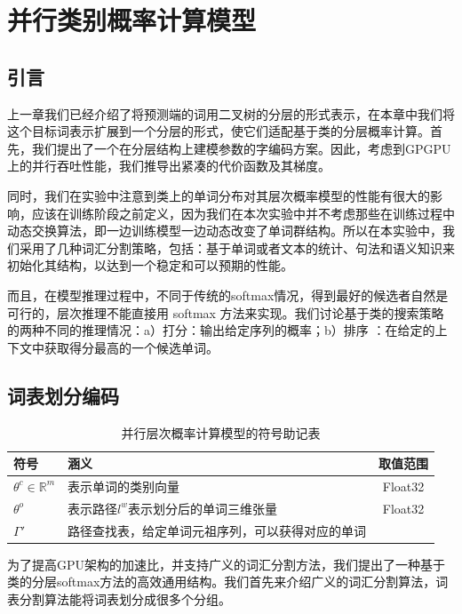 \chapter{并行类别概率计算模型}
\section{引言}
上一章我们已经介绍了将预测端的词用二叉树的分层的形式表示，在本章中我们将这个目标词表示扩展到一个分层的形式，使它们适配基于类的分层概率计算。首先，我们提出了一个在分层结构上建模参数的字编码方案。因此，考虑到GPGPU上的并行吞吐性能，我们推导出紧凑的代价函数及其梯度。

同时，我们在实验中注意到类上的单词分布对其层次概率模型的性能有很大的影响，应该在训练阶段之前定义，因为我们在本次实验中并不考虑那些在训练过程中动态交换算法，即一边训练模型一边动态改变了单词群结构。所以在本实验中，我们采用了几种词汇分割策略，包括：基于单词或者文本的统计、句法和语义知识来初始化其结构，以达到一个稳定和可以预期的性能。

而且，在模型推理过程中，不同于传统的softmax情况，得到最好的候选者自然是可行的，层次推理不能直接用 softmax 方法来实现。我们讨论基于类的搜索策略的两种不同的推理情况：a）打分：输出给定序列的概率；b）排序   ：在给定的上下文中获取得分最高的一个候选单词。


\section{词表划分编码}
\begin{table}[!ht]
  \centering
  \caption{并行层次概率计算模型的符号助记表}
\begin{tabular}{llc}
  \toprule
   符号&涵义&取值范围\\ \midrule
$\theta^c\in\mathbb{R}^m$ &表示单词的类别向量& Float32\\
$ \theta^o$ &表示路径$l^w$表示划分后的单词三维张量&Float32 \\
$\Gamma'$ &路径查找表，给定单词元祖序列，可以获得对应的单词& \\
  \bottomrule
\end{tabular}
\end{table}
为了提高GPU架构的加速比，并支持广义的词汇分割方法，我们提出了一种基于类的分层softmax方法的高效通用结构。我们首先来介绍广义的词汇分割算法，词表分割算法能将词表划分成很多个分组。

